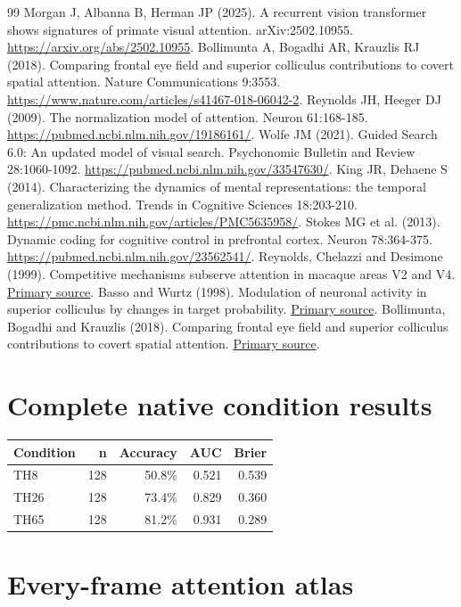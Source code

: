 \documentclass[11pt]{article}
\begin{document}
\begin{thebibliography}{99}
 Morgan J, Albanna B, Herman JP (2025). A recurrent vision transformer shows signatures of primate visual attention. arXiv:2502.10955. \url{https://arxiv.org/abs/2502.10955}.
 Bollimunta A, Bogadhi AR, Krauzlis RJ (2018). Comparing frontal eye field and superior colliculus contributions to covert spatial attention. Nature Communications 9:3553. \url{https://www.nature.com/articles/s41467-018-06042-2}.
 Reynolds JH, Heeger DJ (2009). The normalization model of attention. Neuron 61:168-185. \url{https://pubmed.ncbi.nlm.nih.gov/19186161/}.
 Wolfe JM (2021). Guided Search 6.0: An updated model of visual search. Psychonomic Bulletin and Review 28:1060-1092. \url{https://pubmed.ncbi.nlm.nih.gov/33547630/}.
 King JR, Dehaene S (2014). Characterizing the dynamics of mental representations: the temporal generalization method. Trends in Cognitive Sciences 18:203-210. \url{https://pmc.ncbi.nlm.nih.gov/articles/PMC5635958/}.
 Stokes MG et al. (2013). Dynamic coding for cognitive control in prefrontal cortex. Neuron 78:364-375. \url{https://pubmed.ncbi.nlm.nih.gov/23562541/}.
 Reynolds, Chelazzi and Desimone (1999). Competitive mechanisms subserve attention in macaque areas V2 and V4. \href{https://pubmed.ncbi.nlm.nih.gov/10024360/}{Primary source}.
 Basso and Wurtz (1998). Modulation of neuronal activity in superior colliculus by changes in target probability. \href{https://pubmed.ncbi.nlm.nih.gov/9736670/}{Primary source}.
 Bollimunta, Bogadhi and Krauzlis (2018). Comparing frontal eye field and superior colliculus contributions to covert spatial attention. \href{https://pmc.ncbi.nlm.nih.gov/articles/PMC6120922/}{Primary source}.
\end{thebibliography}\clearpage\appendix\section{Complete native condition results}
\small\begin{longtable}{p{}rrrr}\toprule Condition & n & Accuracy & AUC & Brier\\\midrule\endhead
TH8 & 128 & 50.8\% & 0.521 & 0.539\\
TH26 & 128 & 73.4\% & 0.829 & 0.360\\
TH65 & 128 & 81.2\% & 0.931 & 0.289\\
\bottomrule\end{longtable}\normalsize\section{Every-frame attention atlas}
\end{document}
